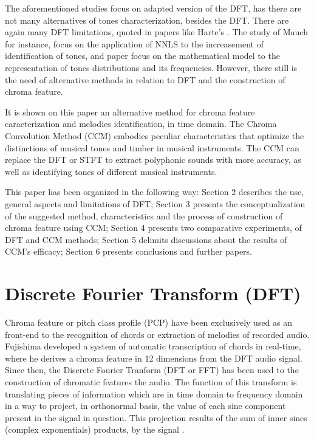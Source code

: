 \documentclass{article}
\begin{document}
The aforementioned studies focus on adapted version of the DFT, has there are not many alternatives of tones characterization, besides the DFT. There are again many DFT limitations, quoted in papers like Harte's \cite{harte2010towards}. The study of Mauch \cite{mauch2010approximate} for instance, focus on the application of NNLS to the increasement of identification of tones, and paper \cite{wakefield1999mathematical} focus on the mathematical model to the representation of tones distributions and its frequencies. However, there still is the need of alternative methods in relation to DFT and the construction of chroma feature.

It is shown on this paper an alternative method for chroma feature caracterization and melodies identification, in time domain. The Chroma Convolution Method (CCM) embodies peculiar characteristics that optimize the distinctions of musical tones and timber in musical instruments. The CCM can replace the DFT or STFT to extract polyphonic sounds with more accuracy, as well as identifying tones of different musical instruments.

	This paper has been organized in the following way: Section 2 describes the use, general aspects and limitations of DFT; Section 3 presents the conceptualization of the suggested method, characteristics and the process of construction of chroma feature using CCM; Section 4 presents two comparative experiments, of DFT and CCM methods; Section 5 delimits discussions about the results of CCM's efficacy; Section 6 presents conclusions and further papers. 

\section{Discrete Fourier Transform (DFT)}\label{sec:sfft}

	Chroma feature or pitch class profile (PCP) have been exclusively used as an front-end to the recognition of chords or extraction of melodies of recorded audio. Fujishima \cite{fujishima1999realtime} developed a system of automatic transcription of chords in real-time, where he derives a chroma feature in 12 dimensions from the DFT audio signal. Since then, the Discrete Fourier Tranform (DFT or FFT) has been used to the construction of chromatic features the audio. The function of this transform is translating pieces of information which are in time domain to frequency domain in a way to project, in orthonormal basis, the value of each sine component present in the signal in question. This projection results of the sum of inner sines (complex exponentials) products, by the signal \cite{vaidyanathan1993multirate}.
\end{document}
